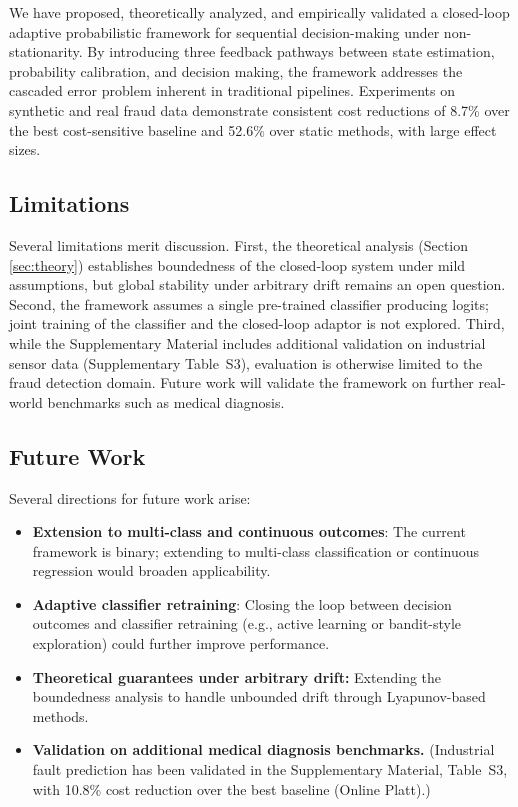 \documentclass[12pt,a4paper]{article}
\begin{document}
We have proposed, theoretically analyzed, and empirically validated a closed-loop adaptive probabilistic framework for sequential decision-making under non-stationarity. By introducing three feedback pathways between state estimation, probability calibration, and decision making, the framework addresses the cascaded error problem inherent in traditional pipelines. Experiments on synthetic and real fraud data demonstrate consistent cost reductions of 8.7\% over the best cost-sensitive baseline and 52.6\% over static methods, with large effect sizes.

\subsection{Limitations}

Several limitations merit discussion. First, the theoretical analysis (Section \ref{sec:theory}) establishes boundedness of the closed-loop system under mild assumptions, but global stability under arbitrary drift remains an open question. Second, the framework assumes a single pre-trained classifier producing logits; joint training of the classifier and the closed-loop adaptor is not explored. Third, while the Supplementary Material includes additional validation on industrial sensor data (Supplementary Table~S3), evaluation is otherwise limited to the fraud detection domain. Future work will validate the framework on further real-world benchmarks such as medical diagnosis.

\subsection{Future Work}

Several directions for future work arise:

\begin{itemize}
    \item \textbf{Extension to multi-class and continuous outcomes}: The current framework is binary; extending to multi-class classification or continuous regression would broaden applicability.
    \item \textbf{Adaptive classifier retraining}: Closing the loop between decision outcomes and classifier retraining (e.g., active learning or bandit-style exploration) could further improve performance.
    \item \textbf{Theoretical guarantees under arbitrary drift:} Extending the boundedness analysis to handle unbounded drift through Lyapunov-based methods.
    \item \textbf{Validation on additional medical diagnosis benchmarks.} (Industrial fault prediction has been validated in the Supplementary Material, Table~S3, with 10.8\% cost reduction over the best baseline (Online Platt).)
\end{itemize}
\end{document}
